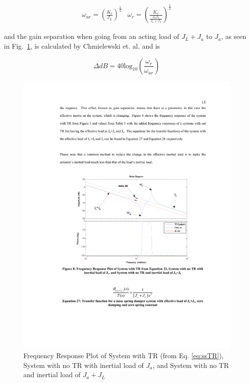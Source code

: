 \begin{equation}\label{eq:res}
\begin{array}{cc}

\omega_{ar} = \left(\frac{K_c}{J_L}\right)^\frac{1}{2}

&

\omega_{r} = \left(\frac{K_c}{\frac{J_aJ_L}{J_a+J_L}}\right)^\frac{1}{2}
\end{array}
\end{equation}

\noindent and the gain separation when going from an acting load of $J_L+J_a$ to $J_a$, as seen in Fig.~\ref{fig:trBode}, is calculated by Chmielewski et. al.\cite{chmielewski} and is

\begin{equation}\label{eq:deltaDB}
\Delta dB = 40\mbox{log}_{10}\left(\frac{\omega_r}{\omega_{ar}}\right)
\end{equation}


\begin{figure}[ht]
  \centering
\includegraphics[width=1.0\columnwidth]{./pix/bode.pdf}
  \caption{Frequency Response Plot of System with TR (from Eq. \ref{eq:ssTR}), System with no TR with
inertial load of $J_a$, and System with no TR and inertial load of $J_a+J_L$}
  \label{fig:trBode}
\end{figure}

